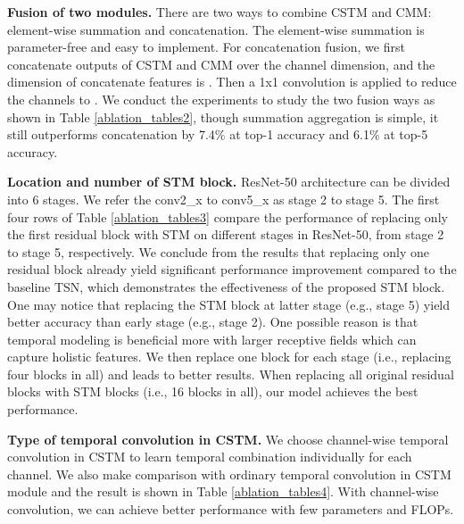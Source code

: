 \documentclass[10pt,twocolumn,letterpaper]{article}
\begin{document}
\setlength{\parskip}{0pt}
	\noindent \textbf{Fusion of two modules.} There are two ways to combine CSTM and CMM: element-wise summation and concatenation. The element-wise summation is parameter-free and easy to implement. For concatenation fusion, we first concatenate outputs of CSTM and CMM over the channel dimension, and the dimension of concatenate features is . Then a 1x1 convolution is applied to reduce the channels to . We conduct the experiments to study the two fusion ways as shown in Table \ref{ablation_tables2}, though summation aggregation is simple, it still outperforms concatenation by 7.4\% at top-1 accuracy and 6.1\% at top-5 accuracy.

\setlength{\parskip}{0pt}
	\noindent \textbf{Location and number of STM block.} ResNet-50 architecture can be divided into 6 stages. We refer the conv2\_x to conv5\_x as stage 2 to stage 5. The first four rows of Table \ref{ablation_tables3} compare the performance of replacing only the first residual block with STM on different stages in ResNet-50, from stage 2 to stage 5, respectively. We conclude from the results that replacing only one residual block already yield significant performance improvement compared to the baseline TSN, which demonstrates the effectiveness of the proposed STM block. One may notice that replacing the STM block at latter stage (e.g., stage 5) yield better accuracy than early stage (e.g., stage 2). One possible reason is that temporal modeling is beneficial more with larger receptive fields which can capture holistic features. We then replace one block for each stage (i.e., replacing four blocks in all) and leads to better results. When replacing all original residual blocks with STM blocks (i.e., 16 blocks in all), our model achieves the best performance.

    \noindent \textbf{Type of temporal convolution in CSTM.} We choose channel-wise temporal convolution in CSTM to learn temporal combination individually for each channel. We also make comparison with ordinary temporal convolution in CSTM module and the result is shown in Table \ref{ablation_tables4}. With channel-wise convolution, we can achieve better performance with few parameters and FLOPs.
\end{document}
